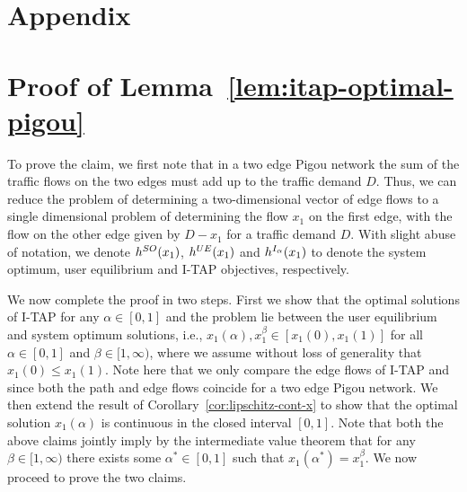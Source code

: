 \documentclass{article}
\begin{document}
 
%
%






\appendix

\section*{Appendix}

\section{Proof of Lemma~\ref{lem:itap-optimal-pigou}}
\label{apdx:pf-pigou-optimal}

To prove the claim, we first note that in a two edge Pigou network the sum of the traffic flows on the two edges must add up to the traffic demand $D$. Thus, we can reduce the problem of determining a two-dimensional vector of edge flows to a single dimensional problem of determining the flow $x_1$ on the first edge, with the flow on the other edge given by $D-x_1$ for a traffic demand $D$. With slight abuse of notation, we denote $h^{SO}(x_1)$, $h^{UE}(x_1)$ and $h^{I_{\alpha}}(x_1)$ to denote the system optimum, user equilibrium and I-TAP objectives, respectively.

We now complete the proof in two steps. First we show that the optimal solutions of I-TAP for any $\alpha \in [0, 1]$ and the \fso problem lie between the user equilibrium and system optimum solutions, i.e., $x_1(\alpha), x_1^{\beta} \in [x_1(0), x_1(1)]$ for all $\alpha \in [0, 1]$ and $\beta \in [1, \infty)$, where we assume without loss of generality that $x_1(0) \leq x_1(1)$. Note here that we only compare the edge flows of I-TAP and \fso since both the path and edge flows coincide for a two edge Pigou network. We then extend the result of Corollary~\ref{cor:lipschitz-cont-x} to show that the optimal solution $x_1(\alpha)$ is continuous in the closed interval $[0, 1]$. Note that both the above claims jointly imply by the intermediate value theorem that for any $\beta \in [1, \infty)$ there exists some $\alpha^* \in [0, 1]$ such that $x_1(\alpha^*) = x_1^{\beta}$. We now proceed to prove the two claims.
\end{document}
